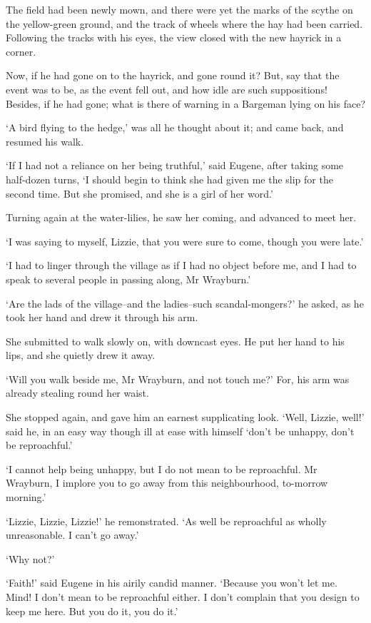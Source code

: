 The field had been newly mown, and there were yet the marks of the
scythe on the yellow-green ground, and the track of wheels where the hay
had been carried. Following the tracks with his eyes, the view closed
with the new hayrick in a corner.

Now, if he had gone on to the hayrick, and gone round it? But, say
that the event was to be, as the event fell out, and how idle are such
suppositions! Besides, if he had gone; what is there of warning in a
Bargeman lying on his face?

‘A bird flying to the hedge,’ was all he thought about it; and came
back, and resumed his walk.

‘If I had not a reliance on her being truthful,’ said Eugene, after
taking some half-dozen turns, ‘I should begin to think she had given me
the slip for the second time. But she promised, and she is a girl of her
word.’

Turning again at the water-lilies, he saw her coming, and advanced to
meet her.

‘I was saying to myself, Lizzie, that you were sure to come, though you
were late.’

‘I had to linger through the village as if I had no object before me,
and I had to speak to several people in passing along, Mr Wrayburn.’

‘Are the lads of the village--and the ladies--such scandal-mongers?’ he
asked, as he took her hand and drew it through his arm.

She submitted to walk slowly on, with downcast eyes. He put her hand to
his lips, and she quietly drew it away.

‘Will you walk beside me, Mr Wrayburn, and not touch me?’ For, his arm
was already stealing round her waist.

She stopped again, and gave him an earnest supplicating look. ‘Well,
Lizzie, well!’ said he, in an easy way though ill at ease with himself
‘don’t be unhappy, don’t be reproachful.’

‘I cannot help being unhappy, but I do not mean to be reproachful. Mr
Wrayburn, I implore you to go away from this neighbourhood, to-morrow
morning.’

‘Lizzie, Lizzie, Lizzie!’ he remonstrated. ‘As well be reproachful as
wholly unreasonable. I can’t go away.’

‘Why not?’

‘Faith!’ said Eugene in his airily candid manner. ‘Because you won’t let
me. Mind! I don’t mean to be reproachful either. I don’t complain that
you design to keep me here. But you do it, you do it.’

